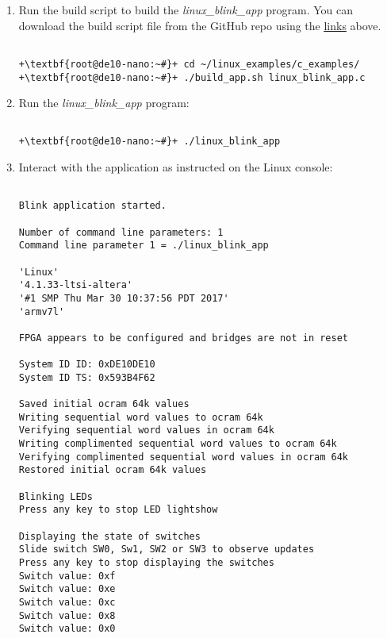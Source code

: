 \begin{flushleft}
\begin{enumerate}[
	label=\textbf{Step \arabic*.},
	leftmargin=*,
	widest={00},
	align=left]

\item Run the build script to build the \emph{linux\_blink\_app} program.  You can download the build script file from the GitHub repo using the \hyperlink{GitHub-files}{\underline{links}} above.

\begin{verbatim}

+\textbf{root@de10-nano:~#}+ cd ~/linux_examples/c_examples/
+\textbf{root@de10-nano:~#}+ ./build_app.sh linux_blink_app.c

\end{verbatim}

\item Run the \emph{linux\_blink\_app} program:

\begin{verbatim}

+\textbf{root@de10-nano:~#}+ ./linux_blink_app

\end{verbatim}

\item Interact with the application as instructed on the Linux console:

\begin{verbatim}

Blink application started.

Number of command line parameters: 1
Command line parameter 1 = ./linux_blink_app

'Linux'
'4.1.33-ltsi-altera'
'#1 SMP Thu Mar 30 10:37:56 PDT 2017'
'armv7l'

FPGA appears to be configured and bridges are not in reset

System ID ID: 0xDE10DE10
System ID TS: 0x593B4F62

Saved initial ocram 64k values
Writing sequential word values to ocram 64k
Verifying sequential word values in ocram 64k
Writing complimented sequential word values to ocram 64k
Verifying complimented sequential word values in ocram 64k
Restored initial ocram 64k values

Blinking LEDs
Press any key to stop LED lightshow

Displaying the state of switches
Slide switch SW0, Sw1, SW2 or SW3 to observe updates
Press any key to stop displaying the switches
Switch value: 0xf
Switch value: 0xe
Switch value: 0xc
Switch value: 0x8
Switch value: 0x0


\end{verbatim}
\end{enumerate}
\end{flushleft}

